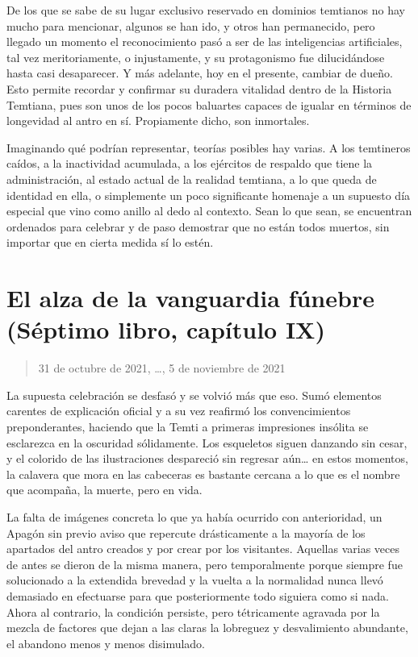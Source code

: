 \documentclass[
]{book}
\begin{document}
De los que se sabe de su lugar exclusivo reservado en dominios temtianos no hay mucho para mencionar, algunos se han ido, y otros han permanecido, pero llegado un momento el reconocimiento pasó a ser de las inteligencias artificiales, tal vez meritoriamente, o injustamente, y su protagonismo fue dilucidándose hasta casi desaparecer. Y más adelante, hoy en el presente, cambiar de dueño. Esto permite recordar y confirmar su duradera vitalidad dentro de la Historia Temtiana, pues son unos de los pocos baluartes capaces de igualar en términos de longevidad al antro en sí. Propiamente dicho, son inmortales.

Imaginando qué podrían representar, teorías posibles hay varias. A los temtineros caídos, a la inactividad acumulada, a los ejércitos de respaldo que tiene la administración, al estado actual de la realidad temtiana, a lo que queda de identidad en ella, o simplemente un poco significante homenaje a un supuesto día especial que vino como anillo al dedo al contexto. Sean lo que sean, se encuentran ordenados para celebrar y de paso demostrar que no están todos muertos, sin importar que en cierta medida sí lo estén.

\hypertarget{el-alza-de-la-vanguardia-fuxfanebre-suxe9ptimo-libro-capuxedtulo-ix}{%
\section{El alza de la vanguardia fúnebre (Séptimo libro, capítulo IX)}\label{el-alza-de-la-vanguardia-fuxfanebre-suxe9ptimo-libro-capuxedtulo-ix}}

\begin{quote}
31 de octubre de 2021, \ldots, 5 de noviembre de 2021
\end{quote}

La supuesta celebración se desfasó y se volvió más que eso. Sumó elementos carentes de explicación oficial y a su vez reafirmó los convencimientos preponderantes, haciendo que la Temti a primeras impresiones insólita se esclarezca en la oscuridad sólidamente. Los esqueletos siguen danzando sin cesar, y el colorido de las ilustraciones despareció sin regresar aún\ldots{} en estos momentos, la calavera que mora en las cabeceras es bastante cercana a lo que es el nombre que acompaña, la muerte, pero en vida.

La falta de imágenes concreta lo que ya había ocurrido con anterioridad, un Apagón sin previo aviso que repercute drásticamente a la mayoría de los apartados del antro creados y por crear por los visitantes. Aquellas varias veces de antes se dieron de la misma manera, pero temporalmente porque siempre fue solucionado a la extendida brevedad y la vuelta a la normalidad nunca llevó demasiado en efectuarse para que posteriormente todo siguiera como si nada. Ahora al contrario, la condición persiste, pero tétricamente agravada por la mezcla de factores que dejan a las claras la lobreguez y desvalimiento abundante, el abandono menos y menos disimulado.
\end{document}
